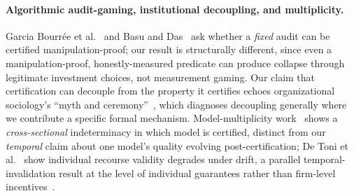 \paragraph{Algorithmic audit-gaming, institutional decoupling, and multiplicity.} Garcia Bourr\'{e}e et al.~\cite{garciabourree2025robust} and Basu and Das~\cite{basu2025fairgame} ask whether a \emph{fixed} audit can be certified manipulation-proof; our result is structurally different, since even a manipulation-proof, honestly-measured predicate can produce collapse through legitimate investment choices, not measurement gaming. Our claim that certification can decouple from the property it certifies echoes organizational sociology's ``myth and ceremony''~\cite{meyer1977institutionalized,edelman1992legal,bromley2012smoke}, which diagnoses decoupling generally where we contribute a specific formal mechanism. Model-multiplicity work~\cite{marx2020predictive,black2022model} shows a \emph{cross-sectional} indeterminacy in which model is certified, distinct from our \emph{temporal} claim about one model's quality evolving post-certification; De Toni et al.~\cite{detoni2025time} show individual recourse validity degrades under drift, a parallel temporal-invalidation result at the level of individual guarantees rather than firm-level incentives~\cite{lyons2021conceptualising}.
